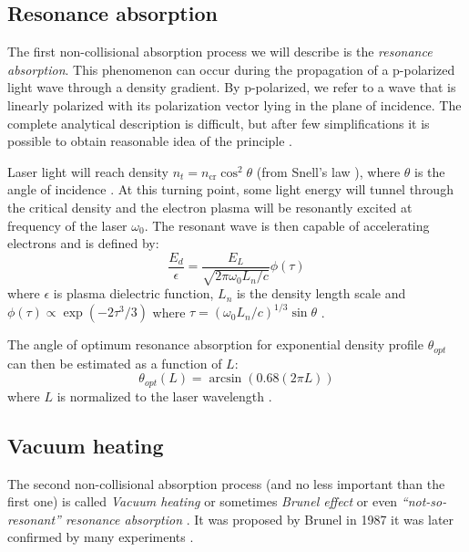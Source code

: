 \subsection*{Resonance absorption}
The first non-collisional absorption process we will describe is the \textit{resonance absorption}. This phenomenon can occur during the propagation of a p-polarized light wave through a density gradient. By p-polarized, we refer to a wave that is linearly polarized with its polarization vector lying in the plane of incidence. The complete analytical description is difficult, but after few simplifications it is possible to obtain reasonable idea of the principle \cite{laser-plasma6}. 

Laser light will reach density $n_t = n_{\mathrm{cr}}\cos^2\theta$ (from Snell's law \cite{absorption2}), where $\theta$ is the angle of incidence \cite{laser-plasma6}. At this turning point, some light energy will tunnel through the critical density and the electron plasma will be resonantly excited at frequency of the laser $\omega_0$. The resonant wave is then capable of accelerating electrons and is defined by:
\begin{equation}
	\label{eq:resonance}
	\frac{E_d}{\epsilon} = \frac{E_L}{\sqrt{2\pi\omega_0 L_n/c}}\phi\left(\tau\right)
\end{equation}
where $\epsilon$ is plasma dielectric function, $L_n$ is the density length scale and $\phi\left(\tau\right) \propto \exp\left(-2\tau^3/3\right)$ where $\tau= \left(\omega_0 L_n/c\right)^{1/3}\sin\theta$ \cite{absorption2,laser-plasma6}.

The angle of optimum resonance absorption for exponential density profile $\theta_{opt}$ can then be estimated as a function of $L$:
\begin{equation}
	\label{eq:res-opt}
	\theta_{opt}\left(L\right) = \arcsin\left(0.68(2\pi L)\right)
\end{equation}
where $L$ is normalized to the laser wavelength \cite{absorption1}.


\subsection*{Vacuum heating}
The second non-collisional absorption process (and no less important than the first one) is called \textit{Vacuum heating} or sometimes \textit{Brunel effect} or even \textit{“not-so-resonant” resonance absorption} \cite{brunel1987}. It was proposed by Brunel in 1987 it was later confirmed by many experiments \cite{absorption2}.

